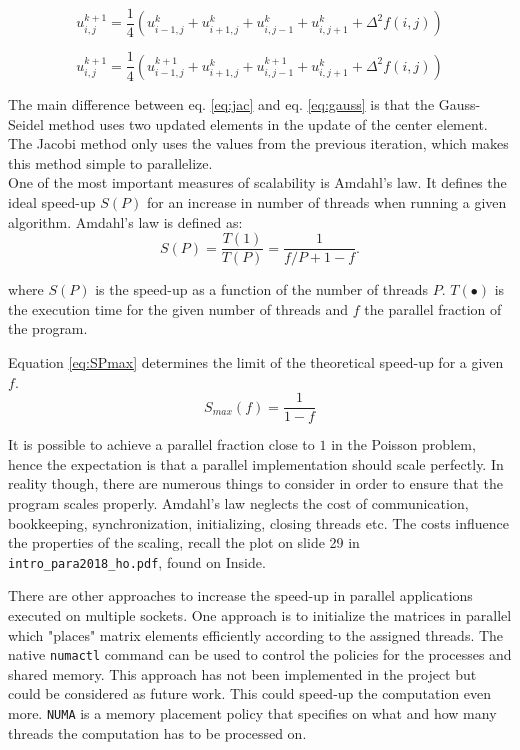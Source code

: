 \begin{equation}
u_{i,j}^{k+1} = \frac{1}{4} (u_{i-1,j}^{k} +
u_{i+1,j}^{k} + u_{i,j-1}^{k} + u_{i,j+1}^{k} + \Delta^2 f(i,j))
\label{eq:jac}
\end{equation}

\begin{equation}
u_{i,j}^{k+1} = \frac{1}{4} (u_{i-1,j}^{k+1} +
u_{i+1,j}^{k} + u_{i,j-1}^{k+1} + u_{i,j+1}^{k} + \Delta^2 f(i,j))
\label{eq:gauss}
\end{equation}

The main difference between eq. \ref{eq:jac} and eq. \ref{eq:gauss} is that the Gauss-Seidel method uses two updated elements in the update of the center element. The Jacobi method only uses the values from the previous iteration, which makes this method simple to parallelize. \\ 

One of the most important measures of scalability is Amdahl's law. 
It defines the ideal speed-up $S(P)$ for an increase in number of threads when running a given algorithm. Amdahl's law is defined as:
\begin{equation}
    S(P) = \frac{T(1)}{T(P)} = \frac{1}{f/P+1-f}.
    \label{eq:SPp}
\end{equation}

where $S(P)$ is the speed-up as a function of the number of threads $P$. $T(\bullet )$ is the execution time for the given number of threads and $f$ the parallel fraction of the program. 

Equation \ref{eq:SPmax} determines the limit of the theoretical speed-up for a given $f$.
\begin{equation}
S_{max}(f) = \frac{1}{1-f}
\label{eq:SPmax}
\end{equation}

It is possible to achieve a parallel fraction close to $1$ in the Poisson problem, hence the expectation is that a parallel implementation should scale perfectly. 
In reality though, there are numerous things to consider in order to ensure that the program scales properly. 
Amdahl's law neglects the cost of communication, bookkeeping, synchronization, initializing, closing threads etc. The costs influence the properties of the scaling, recall the plot on slide 29 in \texttt{intro\_para2018\_ho.pdf}, found on Inside.

There are other approaches to increase the speed-up in parallel applications executed on multiple sockets. One approach is to initialize the matrices in parallel which "places" matrix elements efficiently according to the assigned threads.
The native \texttt{numactl} command can be used to control the policies for the processes and shared memory. This approach has not been implemented in the project but could be considered as future work. This could speed-up the computation even more. \texttt{NUMA} is a memory placement policy that specifies on what and how many threads the computation has to be processed on.

